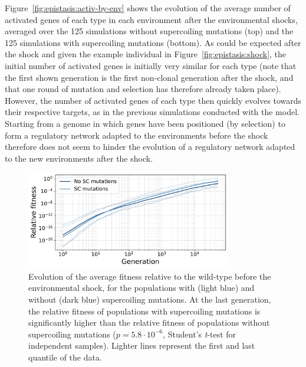 Figure~\ref{fig:epistasis:activ-by-env} shows the evolution of the average number of activated genes of each type in each environment after the environmental shocks, averaged over the 125 simulations without supercoiling mutations (top) and the 125 simulations with supercoiling mutations (bottom).
As could be expected after the shock and given the example individual in Figure~\ref{fig:epistasis:shock}, the initial number of activated genes is initially very similar for each type (note that the first shown generation is the first non-clonal generation after the shock, and that one round of mutation and selection has therefore already taken place).
However, the number of activated genes of each type then quickly evolves towards their respective targets, as in the previous simulations conducted with the model.
Starting from a genome in which genes have been positioned (by selection) to form a regulatory network adapted to the environments before the shock therefore does not seem to hinder the evolution of a regulatory network adapted to the new environments after the shock.

\begin{figure}
\centering
\includegraphics[width=0.8\textwidth]{epistasis/img/relative_fitness_grouped.pdf}
\caption[Average relative fitness to the ancestor, during evolution after an environmental shock]{Evolution of the average fitness relative to the wild-type before the environmental shock, for the populations with (light blue) and without (dark blue) supercoiling mutations.
At the last generation, the relative fitness of populations with supercoiling mutations is significantly higher than the relative fitness of populations without supercoiling mutations ($p = 5.8\cdot10^{-6}$, Student's \emph{t}-test for independent samples).
Lighter lines represent the first and last quantile of the data.}
\label{fig:epistasis:rel-fitness}
\end{figure}

